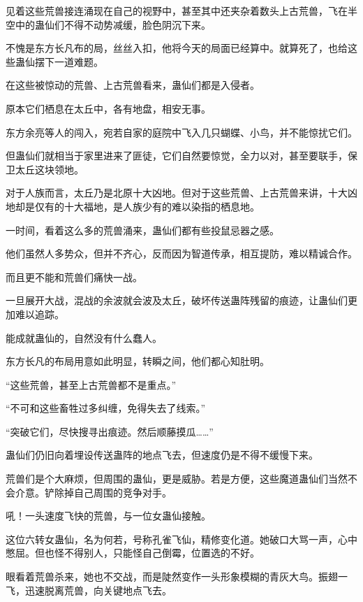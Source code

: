 
\begin{this_body}

见着这些荒兽接连涌现在自己的视野中，甚至其中还夹杂着数头上古荒兽，飞在半空中的蛊仙们不得不动势减缓，脸色阴沉下来。

不愧是东方长凡布的局，丝丝入扣，他将今天的局面已经算中。就算死了，也给这些蛊仙摆下一道难题。

在这些被惊动的荒兽、上古荒兽看来，蛊仙们都是入侵者。

原本它们栖息在太丘中，各有地盘，相安无事。

东方余亮等人的闯入，宛若自家的庭院中飞入几只蝴蝶、小鸟，并不能惊扰它们。

但蛊仙们就相当于家里进来了匪徒，它们自然要惊觉，全力以对，甚至要联手，保卫太丘这块领地。

对于人族而言，太丘乃是北原十大凶地。但对于这些荒兽、上古荒兽来讲，十大凶地却是仅有的十大福地，是人族少有的难以染指的栖息地。

一时间，看着这么多的荒兽涌来，蛊仙们都有些投鼠忌器之感。

他们虽然人多势众，但并不齐心，反而因为智道传承，相互提防，难以精诚合作。

而且更不能和荒兽们痛快一战。

一旦展开大战，混战的余波就会波及太丘，破坏传送蛊阵残留的痕迹，让蛊仙们更加难以追踪。

能成就蛊仙的，自然没有什么蠢人。

东方长凡的布局用意如此明显，转瞬之间，他们都心知肚明。

“这些荒兽，甚至上古荒兽都不是重点。”

“不可和这些畜牲过多纠缠，免得失去了线索。”

“突破它们，尽快搜寻出痕迹。然后顺藤摸瓜……”

蛊仙们仍旧向着埋设传送蛊阵的地点飞去，但速度仍是不得不缓慢下来。

荒兽们是个大麻烦，但周围的蛊仙，更是威胁。若是方便，这些魔道蛊仙们当然不会介意。铲除掉自己周围的竞争对手。

吼！一头速度飞快的荒兽，与一位女蛊仙接触。

这位六转女蛊仙，名为何若，号称孔雀飞仙，精修变化道。她破口大骂一声，心中憋屈。但也怪不得别人，只能怪自己倒霉，位置选的不好。

眼看着荒兽杀来，她也不交战，而是陡然变作一头形象模糊的青灰大鸟。振翅一飞，迅速脱离荒兽，向关键地点飞去。


\end{this_body}
